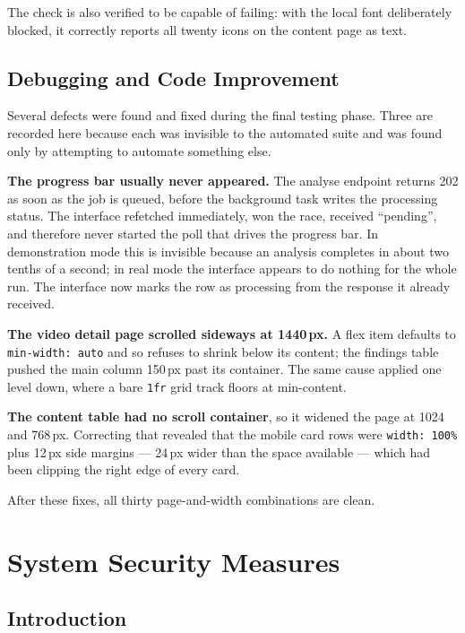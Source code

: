 \documentclass[
12pt,
a4paper,
oneside
]{report}
\begin{document}
The check is also verified to be capable of failing: with the local font
deliberately blocked, it correctly reports all twenty icons on the content page
as text.

\section{Debugging and Code Improvement}

Several defects were found and fixed during the final testing phase. Three are
recorded here because each was invisible to the automated suite and was found
only by attempting to automate something else.

\textbf{The progress bar usually never appeared.} The analyse endpoint returns
202 as soon as the job is queued, before the background task writes the
processing status. The interface refetched immediately, won the race, received
``pending'', and therefore never started the poll that drives the progress bar.
In demonstration mode this is invisible because an analysis completes in about
two tenths of a second; in real mode the interface appears to do nothing for the
whole run. The interface now marks the row as processing from the response it
already received.

\textbf{The video detail page scrolled sideways at 1440\,px.} A flex item
defaults to \texttt{min-width: auto} and so refuses to shrink below its content;
the findings table pushed the main column 150\,px past its container. The same
cause applied one level down, where a bare \texttt{1fr} grid track floors at
min-content.

\textbf{The content table had no scroll container}, so it widened the page at
1024 and 768\,px. Correcting that revealed that the mobile card rows were
\texttt{width: 100\%} plus 12\,px side margins --- 24\,px wider than the space
available --- which had been clipping the right edge of every card.

After these fixes, all thirty page-and-width combinations are clean.

\chapter{System Security Measures}
\label{ch:security}

\section{Introduction}
\end{document}
